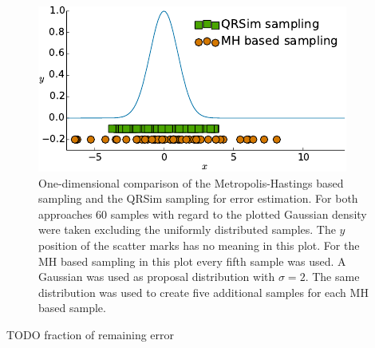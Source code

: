 \begin{figure}
    \centering
    \includegraphics{plots/err-sampling}
    \caption[Comparison of error estimation sampling methods]{One-dimensional 
        comparison of the Metropolis-Hastings based sampling and the QRSim 
        sampling for error estimation. For both approaches 60 samples with 
        regard to the plotted Gaussian density were taken excluding the 
        uniformly distributed samples.  The $y$ position of the scatter marks 
        has no meaning in this plot. For the MH based sampling in this plot 
        every fifth sample was used.  A Gaussian was used as proposal 
        distribution with $\sigma = 2$.  The same distribution was used to 
        create five additional samples for each MH based 
        sample.}\label{fig:err-sampling}
\end{figure}

TODO fraction of remaining error
